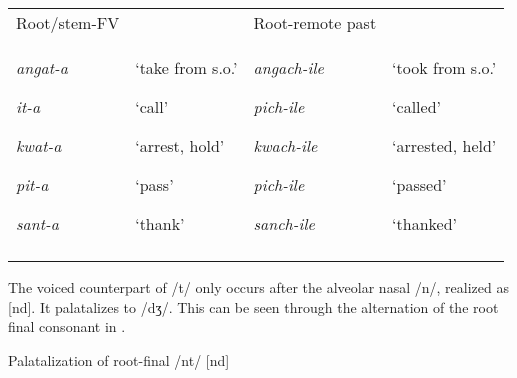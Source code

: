 \documentclass[output=paper]{langsci/langscibook}
\begin{document}
\begin{tabular}{llll}
\lsptoprule
\mdseries Root/stem-FV &  & \mdseries Root-remote past & \\
{\mdseries \emph{angat-a}}

{\mdseries \emph{it-a}}

{\mdseries \emph{kwat-a}}

{\mdseries \emph{pit-a}}

\mdseries \emph{sant-a} & {\mdseries ‘take from s.o.’}

{\mdseries ‘call’}

{\mdseries ‘arrest, hold’}

{\mdseries ‘pass’}

\mdseries ‘thank’ & {\mdseries \emph{angach-ile}}

{\mdseries \emph{pich-ile}}

{\mdseries \emph{kwach-ile}}

{\mdseries \emph{pich-ile }}

\mdseries \emph{sanch-ile} & {\mdseries ‘took from s.o.’}

{\mdseries ‘called’}

{\mdseries ‘arrested, held’}

{\mdseries ‘passed’}

\mdseries ‘thanked’\\
\lspbottomrule
\end{tabular}
The voiced counterpart of /t/ only occurs after the alveolar nasal /n/, realized as [nd]. It palatalizes to /dʒ/. This can be seen through the alternation of the root final consonant in .

\begin{table}
\caption{Palatalization of root-final /nt/ [nd]}
\label{tab:11}
\end{table}
\end{document}

